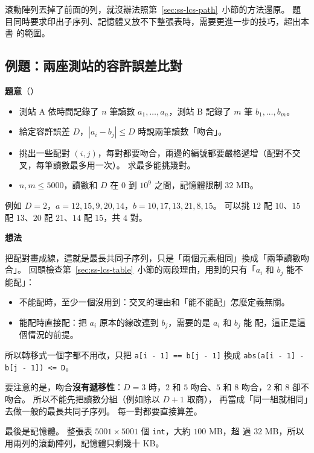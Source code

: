 滾動陣列丟掉了前面的列，就沒辦法照第~\ref{sec:ss-lcs-path}~小節的方法還原。
題目同時要求印出子序列、記憶體又放不下整張表時，需要更進一步的技巧，超出本書
的範圍。

\subsection{例題：兩座測站的容許誤差比對}
\label{sec:ss-ex-stations}

\textbf{題意}（）

\begin{itemize}
\item 測站 A 依時間記錄了 $n$ 筆讀數 $a_1, \ldots, a_n$，測站 B 記錄了 $m$ 筆
$b_1, \ldots, b_m$。
\item 給定容許誤差 $D$，$|a_i - b_j| \le D$ 時說兩筆讀數「吻合」。
\item 挑出一些配對 $(i, j)$，每對都要吻合，兩邊的編號都要嚴格遞增（配對不交
叉，每筆讀數最多用一次）。 求最多能挑幾對。
\item $n, m \le 5000$，讀數和 $D$ 在 $0$ 到 $10^9$ 之間，記憶體限制 $32$ MB。
\end{itemize}

例如 $D = 2$，$a = 12, 15, 9, 20, 14$，$b = 10, 17, 13, 21, 8, 15$。 可以挑
$12$ 配 $10$、$15$ 配 $13$、$20$ 配 $21$、$14$ 配 $15$，共 $4$ 對。

\textbf{想法}

把配對畫成線，這就是最長共同子序列，只是「兩個元素相同」換成「兩筆讀數吻
合」。 回頭檢查第~\ref{sec:ss-lcs-table}~小節的兩段理由，用到的只有「$a_i$ 和
$b_j$ 能不能配」：

\begin{itemize}
\item 不能配時，至少一個沒用到：交叉的理由和「能不能配」怎麼定義無關。
\item 能配時直接配：把 $a_i$ 原本的線改連到 $b_j$，需要的是 $a_i$ 和 $b_j$ 能
配，這正是這個情況的前提。
\end{itemize}

所以轉移式一個字都不用改，只把 \texttt{a[i - 1] == b[j - 1]} 換成
\texttt{abs(a[i - 1] - b[j - 1]) <= D}。

要注意的是，吻合\textbf{沒有遞移性}：$D = 3$ 時，$2$ 和 $5$ 吻合、$5$ 和 $8$
吻合，$2$ 和 $8$ 卻不吻合。 所以不能先把讀數分組（例如除以 $D + 1$ 取商），
再當成「同一組就相同」去做一般的最長共同子序列。 每一對都要直接算差。

最後是記憶體。 整張表 $5001 \times 5001$ 個 \texttt{int}，大約 $100$ MB，超
過 $32$ MB，所以用兩列的滾動陣列，記憶體只剩幾十 KB。

